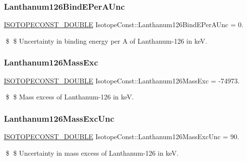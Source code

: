 \subsubsection{\texorpdfstring{Lanthanum126\+Bind\+E\+Per\+A\+Unc}{Lanthanum126BindEPerAUnc}}
{\footnotesize\ttfamily \mbox{\hyperlink{group___isotope_const-_macros_ga8f45a7272ce02c0b4c65c44636ed719a}{I\+S\+O\+T\+O\+P\+E\+C\+O\+N\+S\+T\+\_\+\+D\+O\+U\+B\+LE}} Isotope\+Const\+::\+Lanthanum126\+Bind\+E\+Per\+A\+Unc = 0.}

\$ \$ Uncertainty in binding energy per A of Lanthanum-\/126 in keV. \mbox{\label{group___isotope_const-_lanthanum-_la126_ga53b38a39df8740221c1cbbd3bafff43e}} 
\subsubsection{\texorpdfstring{Lanthanum126\+Mass\+Exc}{Lanthanum126MassExc}}
{\footnotesize\ttfamily \mbox{\hyperlink{group___isotope_const-_macros_ga8f45a7272ce02c0b4c65c44636ed719a}{I\+S\+O\+T\+O\+P\+E\+C\+O\+N\+S\+T\+\_\+\+D\+O\+U\+B\+LE}} Isotope\+Const\+::\+Lanthanum126\+Mass\+Exc = -\/74973.}

\$ \$ Mass excess of Lanthanum-\/126 in keV. \mbox{\label{group___isotope_const-_lanthanum-_la126_gab17eedb342021f1be34240761c4ff713}} 
\subsubsection{\texorpdfstring{Lanthanum126\+Mass\+Exc\+Unc}{Lanthanum126MassExcUnc}}
{\footnotesize\ttfamily \mbox{\hyperlink{group___isotope_const-_macros_ga8f45a7272ce02c0b4c65c44636ed719a}{I\+S\+O\+T\+O\+P\+E\+C\+O\+N\+S\+T\+\_\+\+D\+O\+U\+B\+LE}} Isotope\+Const\+::\+Lanthanum126\+Mass\+Exc\+Unc = 90.}

\$ \$ Uncertainty in mass excess of Lanthanum-\/126 in keV. \mbox{\label{group___isotope_const-_lanthanum-_la126_ga777de506f47966422867b2f05b01d529}} 

